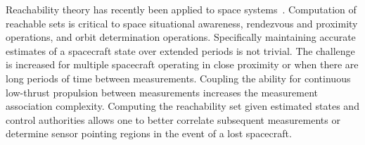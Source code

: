 \documentclass[letterpaper, paper,11pt]{AAS}		%
\begin{document}
Reachability theory has recently been applied to space systems~\cite{holzinger2009,komendera2012a}.
Computation of reachable sets is critical to space situational awareness, rendezvous and proximity operations, and orbit determination operations.
Specifically maintaining accurate estimates of a spacecraft state over extended periods is not trivial.
The challenge is increased for multiple spacecraft operating in close proximity or when there are long periods of time between measurements.
Coupling the ability for continuous low-thrust propulsion between measurements increases the measurement association complexity.
Computing the reachability set given estimated states and control authorities allows one to better correlate subsequent measurements or determine sensor pointing regions in the event of a lost spacecraft. 
\end{document}
